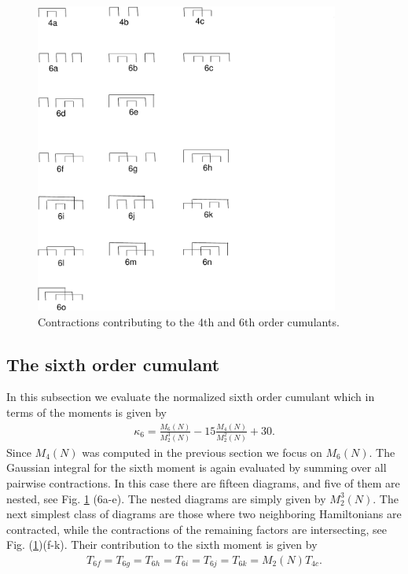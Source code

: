 \documentclass[aps,showpacs,floatfix,superscriptaddress,pre,11pt]{revtex4-1}
\newcommand{\eref}[1]{(\ref{#1})}
\newcommand{\be}{\begin{eqnarray}}
\newcommand{\ee}{\end{eqnarray}}
\begin{document}
          \begin{figure}
            \centering
            \includegraphics[width=10cm]{diagrams.pdf}
            \caption{Contractions contributing to the 4th and 6th order cumulants.}
\label{fig:dia}
          \end{figure}
          \subsection{The sixth order cumulant}

          In this subsection we evaluate the normalized sixth order cumulant which
          in terms of the moments is given by
          \be
          \kappa_6 = \frac{M_6(N)}{M_2^3(N)}- 15 \frac{M_4(N)}{M_2^2(N)}+30.
              \ee
           Since $M_4(N)$ was computed in the previous section we focus on $M_6(N)$.       
              The Gaussian integral for the sixth moment is again evaluated by summing
              over all pairwise contractions. In this case there are fifteen diagrams,
              and five of them are nested, see Fig. \ref{fig:dia} (6a-e). The nested diagrams are simply given
              by $M_2^3(N)$. The next simplest class of diagrams are those
              where two neighboring Hamiltonians are contracted, while
              the contractions of the remaining factors are intersecting,
              see Fig. \eref{fig:dia}(f-k). Their contribution to the
              sixth moment is given by
              \be
              T_{6f}=T_{6g}=T_{6h}=T_{6i}=T_{6j}=T_{6k} = M_2(N)T_{4c}.
              \ee
\end{document}
